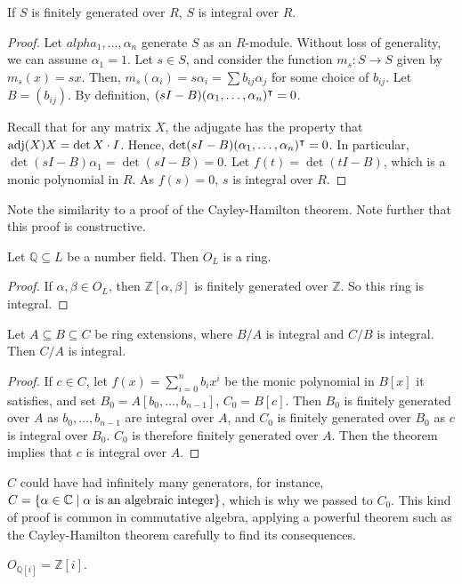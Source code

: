 \begin{theorem}
    If \( S \) is finitely generated over \( R \), \( S \) is integral over \( R \).
\end{theorem}
\begin{proof}
    Let \( alpha_1, \dots, \alpha_n \) generate \( S \) as an \( R \)-module.
    Without loss of generality, we can assume \( \alpha_1 = 1 \).
    Let \( s \in S \), and consider the function \( m_s \colon S \to S \) given by \( m_s(x) = sx \).
    Then, \( m_s(\alpha_i) = s\alpha_i = \sum b_{ij} \alpha_j \) for some choice of \( b_{ij} \).
    Let \( B = (b_{ij}) \).
    By definition, \( (sI - B) (\alpha_1, \dots, \alpha_n)^\intercal = 0 \).
    
    Recall that for any matrix \( X \), the adjugate has the property that \( \operatorname{adj}(X) X = \det X \cdot I \).
    Hence, \( \det(sI - B) (\alpha_1, \dots, \alpha_n)^\intercal = 0 \).
    In particular, \( \det(sI - B) \alpha_1 = \det(sI - B) = 0 \).
    Let \( f(t) = \det(tI - B) \), which is a monic polynomial in \( R \).
    As \( f(s) = 0 \), \( s \) is integral over \( R \).
\end{proof}
Note the similarity to a proof of the Cayley-Hamilton theorem.
Note further that this proof is constructive.
\begin{corollary}
    Let \( \mathbb Q \subseteq L \) be a number field.
    Then \( O_L \) is a ring.
\end{corollary}
\begin{proof}
    If \( \alpha, \beta \in O_L \), then \( \mathbb Z[\alpha, \beta] \) is finitely generated over \( \mathbb Z \).
    So this ring is integral.
\end{proof}
\begin{corollary}
    Let \( A \subseteq B \subseteq C \) be ring extensions, where \( B / A \) is integral and \( C / B \) is integral.
    Then \( C / A \) is integral.
\end{corollary}
\begin{proof}
    If \( c \in C \), let \( f(x) = \sum_{i=0}^n b_i x^i \) be the monic polynomial in \( B[x] \) it satisfies, and set \( B_0 = A[b_0, \dots, b_{n-1}] \), \( C_0 = B[c] \).
    Then \( B_0 \) is finitely generated over \( A \) as \( b_0, \dots, b_{n-1} \) are integral over \( A \), and \( C_0 \) is finitely generated over \( B_0 \) as \( c \) is integral over \( B_0 \).
    \( C_0 \) is therefore finitely generated over \( A \).
    Then the theorem implies that \( c \) is integral over \( A \).
\end{proof}
\begin{remark}
    \( C \) could have had infinitely many generators, for instance, \( C = \qty{\alpha \in \mathbb C \mid \alpha \text{ is an algebraic integer}} \), which is why we passed to \( C_0 \).
    This kind of proof is common in commutative algebra, applying a powerful theorem such as the Cayley-Hamilton theorem carefully to find its consequences.
\end{remark}
\begin{example}
    \( O_{\mathbb Q[i]} = \mathbb Z[i] \).
\end{example}

